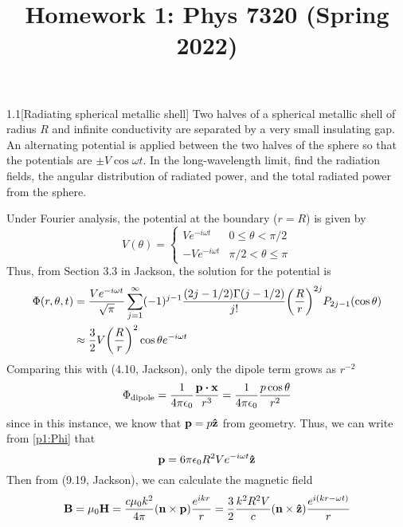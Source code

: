 \documentclass[12pt]{article}
\title{Homework 1: Phys 7320 (Spring 2022)}
\begin{document}
\maketitle
\begin{problem}{1.1}[Radiating spherical metallic shell]
Two halves of a spherical metallic shell of radius $R$ and infinite conductivity
are separated by a very small insulating gap. An alternating potential is
applied between the two halves of the sphere so that the potentials are $\pm
V\cos\omega t$. In the long-wavelength limit, find the radiation fields, the
angular distribution of radiated power, and the total radiated power from the
sphere.
\begin{solution}
Under Fourier analysis, the potential at the boundary ($r=R$) is given by
\begin{equation}
    V(\theta)=\begin{cases}
        Ve^{-i\omega t} & 0\leq\theta < \pi/2\\
        -Ve^{-i\omega t}&\pi/2<\theta\leq\pi
    \end{cases} 
\end{equation}
Thus, from Section 3.3 in Jackson, the solution for the potential is
\begin{align}\label{p1:Phi}
    \Phi(r,\theta,t)
    &=\frac{Ve^{-i\omega t}}{\sqrt\pi}
        \sum_{j=1}^\infty(-1)^{j-1}\frac{(2j-1/2)\Gamma(j-1/2)}{j!}
        \qty(\frac{R}{r})^{2j}P_{2j-1}(\cos\theta)\notag\\
    &\approx\frac32V\qty(\frac{R}{r})^2\cos\theta e^{-i\omega t}
\end{align}
Comparing this with (4.10, Jackson), only the dipole term grows as $r^{-2}$
\begin{equation}
    \Phi_\text{dipole}=\frac1{4\pi\epsilon_0}\frac{\vb{p}\vdot\vb{x}}{r^3}
    =\frac1{4\pi\epsilon_0}\frac{p\cos\theta}{r^2}
\end{equation}
since in this instance, we know that $\vb{p}=p\vb{\hat{z}}$ from geometry. Thus, we can
write from \eqref{p1:Phi} that
\begin{equation}
    \vb{p}=6\pi\epsilon_0R^2Ve^{-i\omega t}\vb{\hat{z}}
\end{equation}
Then from (9.19, Jackson), we can calculate the magnetic field
\begin{align}
    \vb{B}
    =\mu_0\vb{H}
    =\frac{c\mu_0k^2}{4\pi}\qty(\vb{n}\times\vb{p})\frac{e^{ikr}}{r}
    =\frac32\frac{k^2R^2V}{c}\qty(\vb{n}\times\zhat)\frac{e^{i(kr-\omega
    t)}}{r}

\end{align}
\end{solution}
\end{problem}
\end{document}
